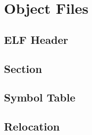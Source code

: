 
\chapter{Object Files}

\section{ELF Header}

\section{Section}

\section{Symbol Table}

\section{Relocation}


